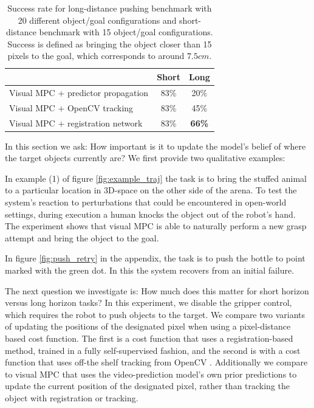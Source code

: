 \begin{table}
	{\footnotesize
		\begin{center}
			\begin{tabular}{lcc}
				\toprule
				& Short & Long \\
				\midrule
				Visual MPC $+$ predictor propagation  & 83\% & 20\% \\
				Visual MPC $+$ OpenCV tracking  & 83\%  & 45\% \\
				Visual MPC $+$ registration network & 83\% & \textbf{66\%}  \\
				\bottomrule
			\end{tabular}
		\end{center}
	}
	\caption{\small Success rate for long-distance pushing benchmark with 20 different object/goal configurations and short-distance benchmark with 15 object/goal configurations. Success is defined as bringing the object closer than 15 pixels to the goal, which corresponds to around $7.5cm$.}
	\label{table:res_long_short}
\end{table}
In this section we ask: How important  is it to update the model's belief of where the target objects currently are? 
We first provide two qualitative examples:

In example (1) of figure \ref{fig:example_traj} the task is to bring the stuffed animal to a particular location in 3D-space on the other side of the arena. To test the system's reaction to perturbations that could be encountered in open-world settings, during execution a human knocks the object out of the robot's hand. The experiment shows that visual MPC is able to naturally perform a new grasp attempt and bring the object to the goal.

In figure \ref{fig:push_retry} in the appendix, the task is to push the bottle to point marked with the green dot. In this the system recovers from an initial failure.

The next question we investigate is: How much does this matter for short horizon versus long horizon tasks? 
In this experiment, we disable the gripper control, which requires the robot to push objects to the target. We compare two variants of updating the positions of the designated pixel when using a pixel-distance based cost function. The first is a cost function that uses a registration-based method, trained in a fully self-supervised fashion, and the second is with a cost function that uses off-the shelf tracking from OpenCV \cite{babenko2009visual}. Additionally we compare to visual MPC that uses the video-prediction model's own prior predictions to update the current position of the designated pixel, rather than tracking the object with registration or tracking.

